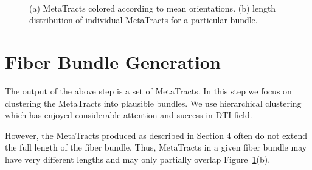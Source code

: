 \begin{figure}[h]
\centering
	\\
	\caption{(a) MetaTracts colored according to mean orientations. (b) length distribution of individual MetaTracts for a particular bundle.}
	\label{fig:length_distribution}
\end{figure}

\section {Fiber Bundle Generation}
\label{subsec:fiber-bundles}
The output of the above step is a set of MetaTracts. In this step we focus on clustering the MetaTracts into plausible bundles. We use hierarchical clustering which has enjoyed considerable attention and success in DTI field. 

However, the MetaTracts produced as described in Section 4 often do not extend the full length of the fiber bundle.  Thus, MetaTracts
in a given fiber bundle may have very different lengths and may only partially overlap Figure~\ref{fig:length_distribution}(b).

